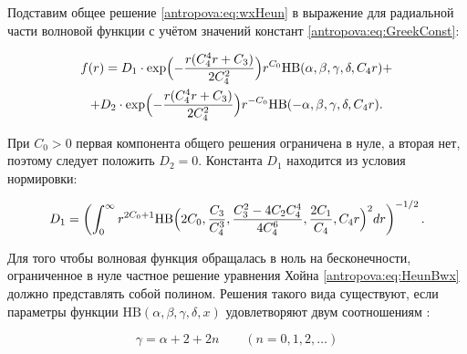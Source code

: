 \smallskip





Подставим общее решение \eqref{antropova:eq:wxHeun} в выражение для радиальной части волновой функции с учётом значений констант \eqref{antropova:eq:GreekConst}:

\begin{multline*}

f(r) = D_1\cdot \exp\Bigl({-\frac{r(C_4^4r+C_3)}{2C_4^2}}\Bigr)r^{C_0}\text{HB}(\alpha,\beta,\gamma,\delta,C_4r) + \\

+ D_2\cdot \exp\Bigl({-\frac{r(C_4^4r+C_3)}{2C_4^2}}\Bigr)r^{-C_0}\text{HB}(-\alpha,\beta,\gamma,\delta,C_4r) .

\end{multline*}

\par

При $C_0 > 0$ первая компонента общего решения ограничена  в нуле, а вторая нет, поэтому следует положить $D_2 = 0$. Константа $D_1$ находится из условия нормировки:

\begin{equation*}


D_1 = \left(\int_0^{\infty} r^{2C_0 + 1}\text{HB}\Bigl(2C_0,\frac{C_3}{C_4^3},\frac{C_3^2 - 4C_2C_4^4}{4C_4^6},\frac{2C_1}{C_4},C_4r\Bigr)^2 dr \right)^{-1/2} \text{.}

\end{equation*}



\smallskip





    Для того чтобы волновая функция  обращалась в ноль на бесконечности, ограниченное в нуле частное решение уравнения Хойна \eqref{antropova:eq:HeunBwx} должно представлять собой  полином. Решения такого вида существуют, если параметры функции $\text{HB}(\alpha,\beta,\gamma,\delta,x)$   удовлетворяют двум соотношениям \cite{antropova:bib:Arriola1991}:

\begin{equation}

\label{antropova:eq:PolynomCond1}

\gamma = \alpha + 2 + 2n\qquad (n = 0, 1, 2, \dots{})

\end{equation}

